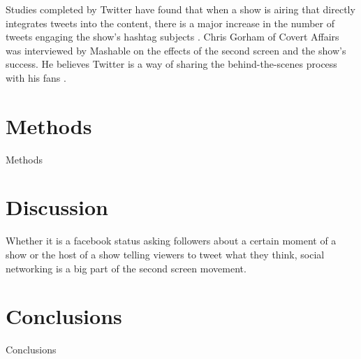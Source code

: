 \documentclass[11pt, oneside]{article}
\begin{document}
Studies completed by Twitter have found that when a show is airing that directly integrates tweets into the content, there is a major increase in the number of tweets engaging the show's hashtag subjects \cite{TwitterTV}. Chris Gorham of Covert Affairs was interviewed by Mashable on the effects of the second screen and the show's success. He believes Twitter is a way of sharing the behind-the-scenes process with his fans \cite{MashableChris}.



\section{Methods}
Methods

\section{Discussion}
Whether it is a facebook status asking followers about a certain moment of a show or the host of a show telling viewers to tweet what they think, social networking is a big part of the second screen movement. 

\section{Conclusions}
Conclusions

{}

\end{document}
